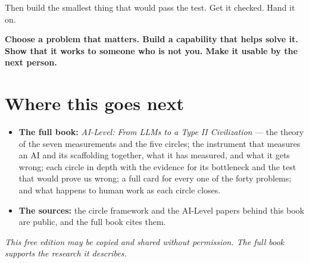 \documentclass[11pt]{article}
\begin{document}
Then build the smallest thing that would pass the test. Get it checked. Hand it on.

\textbf{Choose a problem that matters. Build a capability that helps solve it. Show that it works to someone who is not you. Make it usable by the next person.}

\section*{Where this goes next}

\begin{itemize}[leftmargin=1.4em,itemsep=2pt]
\item \textbf{The full book:} \emph{AI-Level: From LLMs to a Type II Civilization} --- the theory of the seven measurements and the five circles; the instrument that measures an AI and its scaffolding together, what it has measured, and what it gets wrong; each circle in depth with the evidence for its bottleneck and the test that would prove us wrong; a full card for every one of the forty problems; and what happens to human work as each circle closes.
\item \textbf{The sources:} the circle framework and the AI-Level papers behind this book are public, and the full book cites them.
\end{itemize}

\emph{This free edition may be copied and shared without permission. The full book supports the research it describes.}
\end{document}
